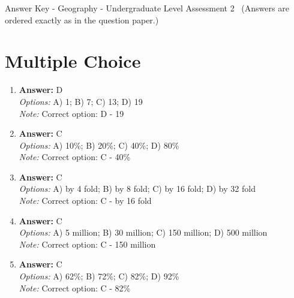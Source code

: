 \documentclass[12pt]{article}
\begin{document}
\begin{center}
Answer Key - Geography - Undergraduate Level Assessment 2 \
\small (Answers are ordered exactly as in the question paper.)
\end{center}

\section*{Multiple Choice}
\begin{enumerate}[label=\arabic*.]
\item \textbf{Answer:} D
\\ \textit{Options:} A) 1; B) 7; C) 13; D) 19
\\ \textit{Note:} Correct option: D - 19
\item \textbf{Answer:} C
\\ \textit{Options:} A) 10\%; B) 20\%; C) 40\%; D) 80\%
\\ \textit{Note:} Correct option: C - 40\%
\item \textbf{Answer:} C
\\ \textit{Options:} A) by 4 fold; B) by 8 fold; C) by 16 fold; D) by 32 fold
\\ \textit{Note:} Correct option: C - by 16 fold
\item \textbf{Answer:} C
\\ \textit{Options:} A) 5 million; B) 30 million; C) 150 million; D) 500 million
\\ \textit{Note:} Correct option: C - 150 million
\item \textbf{Answer:} C
\\ \textit{Options:} A) 62\%; B) 72\%; C) 82\%; D) 92\%
\\ \textit{Note:} Correct option: C - 82\%
\end{enumerate}
\end{document}
